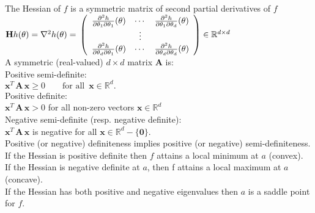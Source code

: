 The Hessian of $f$ is a symmetric matrix of second partial derivatives of $f$\\

$\mathbf{H} h(\theta )= \nabla ^{2} h(\theta )= \\
\left(\begin{array}{ c c c }
\frac{\partial ^{2} h}{\partial \theta _{1} \partial \theta _{1}} (\theta ) & \cdots  & \frac{\partial ^{2} h}{\partial \theta _{1} \partial \theta _{d}} (\theta )\\
 & \vdots  & \\
\frac{\partial ^{2} h}{\partial \theta _{d} \partial \theta _{1}} (\theta ) & \cdots  & \frac{\partial ^{2} h}{\partial \theta _{d} \partial \theta _{d}} (\theta )
\end{array}\right) \in \mathbb{R}^{d\times d}$\\

A symmetric (real-valued) $d\times d$  matrix $\mathbf{A}$ is:\\

Positive semi-definite:\\
$\mathbf{x}^ T \, \mathbf{A}\, \mathbf{x} \geq 0\qquad \text {for all }\,  \mathbf{x}\in \mathbb {R}^ d.$\\

Positive definite:\\
$\mathbf{x}^ T \, \mathbf{A}\, \mathbf{x}> 0$ for all non-zero vectors $\mathbf{x}\in \mathbb {R}^ d$\\

Negative semi-definite (resp. negative definite):\\

$\mathbf{x}^ T \, \mathbf{A}\, \mathbf{x}$ is negative for all $\mathbf{x}\in \mathbb {R}^ d-\{ \mathbf{0}\}$.\\

Positive (or negative) definiteness implies positive (or negative) semi-definiteness.\\

If the Hessian is positive definite then $f$ attains a local minimum at $a$ (convex).\\

If the Hessian is negative definite at $a$, then f attains a local maximum at $a$ (concave).\\

If the Hessian has both positive and negative eigenvalues then $a$ is a saddle point for $f$.

	